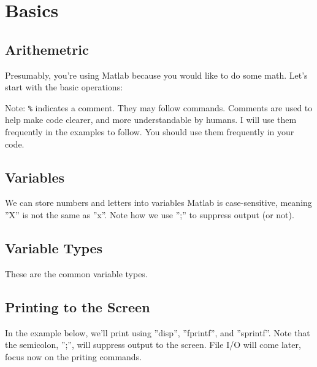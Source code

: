 
\pagebreak
\section{Basics}

\subsection{Arithemetric}
Presumably, you're using Matlab because you would like to do some math.
 Let's start with the basic operations:

\begin{quote}

\end{quote}
\noindent Note: \texttt{\%} indicates a comment.
 They may follow commands.
 Comments are used to help make code clearer, and more understandable by humans.
 I will use them frequently in the examples to follow.
 You should use them frequently in your code.

\pagebreak
\subsection{Variables}
We can store numbers and letters into variables
 Matlab is case-sensitive, meaning ''X'' is not the same as ''x''.
 Note how we use '';'' to suppress output (or not).

\begin{quote}

\end{quote}

\pagebreak
\subsection{Variable Types}
These are the common variable types.

\begin{quote}

\end{quote}

\pagebreak
\subsection{Printing to the Screen}
In the example below, we'll print using
 ''disp'',
 ''fprintf'',
 and ''sprintf''.
 Note that the semicolon, '';'', will suppress output to the screen.
 File I/O will come later, focus now on the priting commands.
\begin{quote}

\end{quote}

